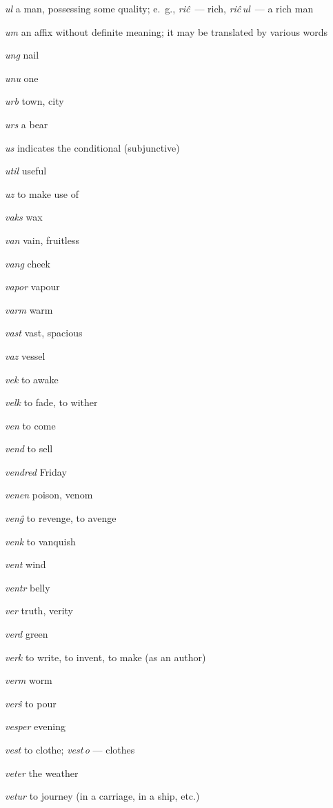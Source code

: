 \begin{landscape}
\begin{multicols}{5}
\begin{outdent}{1em}
\emph{ul}  a man, possessing some quality; e.~g., \emph{riĉ\,} — rich, \emph{riĉ\,ul\,} — a rich man

\emph{um}  an affix without definite meaning; it may be translated by various words

\emph{ung}  nail

\emph{unu } one

\emph{urb}  town, city

\emph{urs}  a bear

\emph{us}  indicates the conditional (subjunctive)

\emph{util } useful

\emph{uz}  to make use of 
\end{outdent}


\begin{outdent}{1em}
\emph{vaks}  wax

\emph{van}  vain, fruitless

\emph{vang}  cheek

\emph{vapor}  vapour

\emph{varm}  warm

\emph{vast}  vast, spacious

\emph{vaz}  vessel

\emph{vek } to awake

\emph{velk}  to fade, to wither

\emph{ven } to come

\emph{vend}  to sell

\emph{vendred } Friday

\emph{venen } poison, venom

\emph{venĝ}  to revenge, to avenge

\emph{venk } to vanquish

\emph{vent } wind

\emph{ventr}  belly

\emph{ver}  truth, verity

\emph{verd } green

\emph{verk}  to write, to invent, to make (as an author)

\emph{verm}  worm

\emph{verŝ}  to pour

\emph{vesper}  evening

\emph{vest}  to clothe; \emph{vest\,o} — clothes

\emph{veter}  the weather

\emph{vetur}  to journey (in a carriage, in a ship, etc.)


\end{outdent}
\end{multicols}
\end{landscape}
